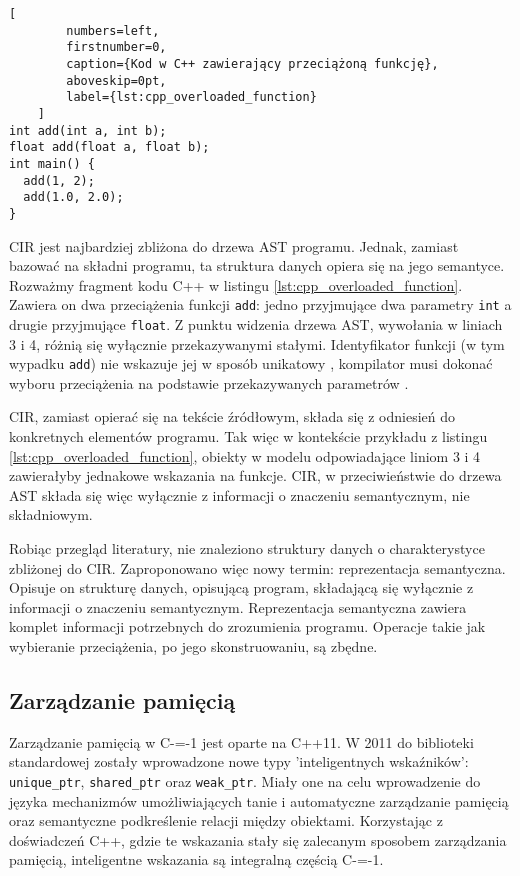 \begin{minipage}{\linewidth}
	\begin{lstlisting}[
		numbers=left,
		firstnumber=0,
		caption={Kod w C++ zawierający przeciążoną funkcję},
		aboveskip=0pt,
		label={lst:cpp_overloaded_function}
	]
int add(int a, int b);
float add(float a, float b);
int main() {
  add(1, 2);
  add(1.0, 2.0);
}
	\end{lstlisting}
\end{minipage}

CIR jest najbardziej zbliżona do drzewa AST programu.
Jednak, zamiast bazować na składni programu, ta struktura danych opiera się na jego semantyce.
Rozważmy fragment kodu C++ w listingu \ref{lst:cpp_overloaded_function}.
Zawiera on dwa przeciążenia funkcji \lstinline{add}: jedno przyjmujące dwa parametry \lstinline{int} a drugie przyjmujące \lstinline{float}.
Z punktu widzenia drzewa AST, wywołania w liniach 3 i 4, różnią się wyłącznie przekazywanymi stałymi.
Identyfikator funkcji (w tym wypadku \lstinline{add}) nie wskazuje jej w sposób unikatowy \cite{ISO:cpp20}, kompilator musi dokonać wyboru przeciążenia na podstawie przekazywanych parametrów \cite{cpp:function_overload_frontend}.

CIR, zamiast opierać się na tekście źródłowym, składa się z odniesień do konkretnych elementów programu.
Tak więc w kontekście przykładu z listingu \ref{lst:cpp_overloaded_function}, obiekty w modelu odpowiadające liniom 3 i 4 zawierałyby jednakowe wskazania na funkcje.
CIR, w przeciwieństwie do drzewa AST składa się więc wyłącznie z informacji o znaczeniu semantycznym, nie składniowym.

Robiąc przegląd literatury, nie znaleziono struktury danych o charakterystyce zbliżonej do CIR.
Zaproponowano więc nowy termin: reprezentacja semantyczna.
Opisuje on strukturę danych, opisującą program, składającą się wyłącznie z informacji o znaczeniu semantycznym.
Reprezentacja semantyczna zawiera komplet informacji potrzebnych do zrozumienia programu.
Operacje takie jak wybieranie przeciążenia, po jego skonstruowaniu, są zbędne.

\subsection{Zarządzanie pamięcią}
\label{memory_management}
Zarządzanie pamięcią w C-=-1 jest oparte na C++11. W 2011 do biblioteki standardowej zostały wprowadzone nowe typy 'inteligentnych wskaźników': \lstinline{unique_ptr}, \lstinline{shared_ptr} oraz \lstinline{weak_ptr}\cite{ISO:2012:III}.
Miały one na celu wprowadzenie do języka mechanizmów umożliwiających tanie i automatyczne zarządzanie pamięcią oraz semantyczne podkreślenie relacji między obiektami.
Korzystając z doświadczeń C++, gdzie te wskazania stały się zalecanym sposobem zarządzania pamięcią\cite{cpp:core_guidelines}, inteligentne wskazania są integralną częścią C-=-1.
